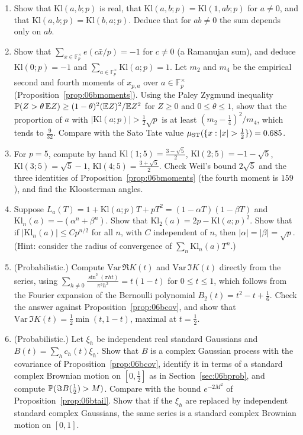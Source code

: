 \begin{enumerate}
\item\label{ex:06bbasic} Show that $\mathrm{Kl}(a,b;p)$ is real, that $\mathrm{Kl}(a,b;p)=\mathrm{Kl}(1,ab;p)$ for $a\ne0$, and that $\mathrm{Kl}(a,b;p)=\mathrm{Kl}(b,a;p)$. Deduce that for $ab\ne0$ the sum depends only on $ab$.
\item Show that $\sum_{x\in\mathbb{F}_p^\times}e(c\bar x/p)=-1$ for $c\ne0$ (a Ramanujan sum), and deduce $\mathrm{Kl}(0;p)=-1$ and $\sum_{a\in\mathbb{F}_p^\times}\mathrm{Kl}(a;p)=1$. Let $m_2$ and $m_4$ be the empirical second and fourth moments of $x_{p,a}$ over $a\in\mathbb{F}_p^\times$ (Proposition~\ref{prop:06bmoments}). Using the Paley Zygmund inequality $\mathbb{P}(Z>\theta\,\mathbb{E} Z)\ge(1-\theta)^2(\mathbb{E} Z)^2/\mathbb{E} Z^2$ for $Z\ge0$ and $0\le\theta\le1$, show that the proportion of $a$ with $|\mathrm{Kl}(a;p)|>\frac12\sqrt p$ is at least $(m_2-\frac14)^2/m_4$, which tends to $\frac9{32}$. Compare with the Sato Tate value $\ST(\{x:|x|>\frac12\})=0.685$.
\item For $p=5$, compute by hand $\mathrm{Kl}(1;5)=\frac{3-\sqrt5}2$, $\mathrm{Kl}(2;5)=-1-\sqrt5$, $\mathrm{Kl}(3;5)=\sqrt5-1$, $\mathrm{Kl}(4;5)=\frac{3+\sqrt5}2$. Check Weil's bound $2\sqrt5$ and the three identities of Proposition~\ref{prop:06bmoments} (the fourth moment is $159$), and find the Kloosterman angles.
\item\label{ex:06bweilL} Suppose $L_a(T)=1+\mathrm{Kl}(a;p)T+pT^2=(1-\alpha T)(1-\beta T)$ and $\mathrm{Kl}_n(a)=-(\alpha^n+\beta^n)$. Show that $\mathrm{Kl}_2(a)=2p-\mathrm{Kl}(a;p)^2$. Show that if $|\mathrm{Kl}_n(a)|\le Cp^{n/2}$ for all $n$, with $C$ independent of $n$, then $|\alpha|=|\beta|=\sqrt p$. (Hint: consider the radius of convergence of $\sum_n\mathrm{Kl}_n(a)T^n$.)
\item (Probabilistic.) Compute $\mathrm{Var}\,\Re K(t)$ and $\mathrm{Var}\,\Im K(t)$ directly from the series, using $\sum_{h\ne0}\frac{\sin^2(\pi ht)}{\pi^2h^2}=t(1-t)$ for $0\le t\le1$, which follows from the Fourier expansion of the Bernoulli polynomial $B_2(t)=t^2-t+\frac16$. Check the answer against Proposition~\ref{prop:06bcov}, and show that $\mathrm{Var}\,\Im K(t)=\frac12\min(t,1-t)$, maximal at $t=\frac12$.
\item\label{ex:06bgauss} (Probabilistic.) Let $\xi_h$ be independent real standard Gaussians and $B(t)=\sum_hc_h(t)\xi_h$. Show that $B$ is a complex Gaussian process with the covariance of Proposition~\ref{prop:06bcov}, identify it in terms of a standard complex Brownian motion on $[0,\frac12]$ as in Section~\ref{sec:06bprob}, and compute $\mathbb{P}(\Im B(\frac12)>M)$. Compare with the bound $e^{-2M^2}$ of Proposition~\ref{prop:06btail}. Show that if the $\xi_h$ are replaced by independent standard complex Gaussians, the same series is a standard complex Brownian motion on $[0,1]$.
\end{enumerate}

